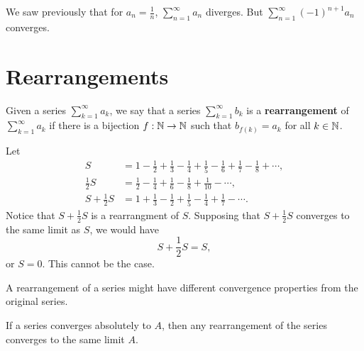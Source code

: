 \begin{example}
  We saw previously that for $a_n = \frac{1}{n}$,
  $\sum_{n=1}^\infty a_n$ diverges. But
  $\sum_{n = 1}^\infty (-1)^{n+1} a_n$ converges.
\end{example}

\section{Rearrangements}

\begin{definition}
  Given a series $\sum_{k = 1}^\infty a_k$,
  we say that a series $\sum_{k = 1}^\infty b_k$ is
  a \textbf{rearrangement} of $\sum_{k = 1}^\infty a_k$
  if there is a bijection $f : \mathbb{N} \to \mathbb{N}$
  such that $b_{f(k)} = a_k$ for all $k \in \mathbb{N}$.
\end{definition}

\begin{example}
  Let
  \begin{align*}
    S &= 1 - \frac{1}{2} + \frac{1}{3} - \frac{1}{4} + \frac{1}{5} - \frac{1}{6} + \frac{1}{7} - \frac{1}{8} + \cdots, \\
    \frac{1}{2}S &= \frac{1}{2} - \frac{1}{4} + \frac{1}{6} - \frac{1}{8} + \frac{1}{10} - \cdots, \\
    S + \frac{1}{2}S &= 1 + \frac{1}{3} - \frac{1}{2} + \frac{1}{5} - \frac{1}{4} + \frac{1}{7} - \cdots.
  \end{align*}
  Notice that $S + \frac{1}{2}S$ is a rearrangment
  of $S$. Supposing that $S + \frac{1}{2}S$ converges
  to the same limit as $S$, we would have
  \[S + \frac{1}{2}S = S,\]
  or $S = 0$. This cannot be the case.
\end{example}

\begin{remark}
  A rearrangement of a series might have
  different convergence properties from the original
  series.
\end{remark}

\begin{theorem}
  If a series converges absolutely to $A$, then
  any rearrangement of the series converges to the
  same limit $A$.
\end{theorem}


